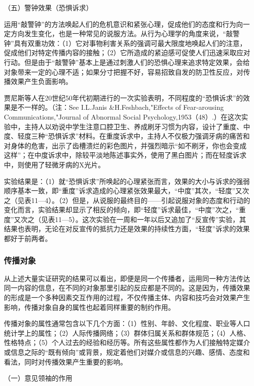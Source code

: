 \documentclass[UTF8,12pt]{ctexart}
\numberwithin{equation}{section} %
\numberwithin{figure}{section}
\numberwithin{table}{section}
\begin{document}
	（五）警钟效果（恐惧诉求）
	
	运用“敲警钟”的方法唤起人们的危机意识和紧张心理，促成他们的态度和行为向一定方向发生变化，也是一种常见的说服方法。从行为心理学的角度来说，“敲警钟”具有双重功效：（1）它对事物利害关系的强调可最大限度地唤起人们的注意，促成他们对特定传播内容的接触；（2）它所造成的紧迫感可促使人们迅速采取应对行动。但是由于“敲警钟”基本上是通过刺激人们的恐惧心理来追求特定效果，会给对象带来一定的心理不适；如果分寸把握不好，容易招致自发的防卫性反应，对传播效果产生负面影响。
	
	贾尼斯等人在20世纪50年代初期进行的一次实验表明，不同程度的“恐惧诉求”的效果是不一样的。（注：See I.L.Janis \&H.Feshbach,"Effects of Fear-arousing Communications,"Journal of Abnormal Social Psychology,1953（48）.）在这次实验中，主持人以劝说中学生注意口腔卫生、养成刷牙习惯为内容，设计了重度、中度、轻度三种“恐惧诉求”材料。在重度诉求中，主持人不仅极力强调牙病的痛苦和对身体的危害，出示了齿槽溃烂的彩色图片，并强烈暗示“如不刷牙，你也会变成这样”；在中度诉求中，除较平淡地陈述事实外，使用了黑白图片；而在轻度诉求中，则使用了轻微牙病的X光片。
	
	实验结果是：（1）就“恐惧诉求”所唤起的心理紧张而言，效果的大小与诉求的强弱顺序基本一致，即“重度”诉求造成的心理紧张效果最大，“中度”其次，“轻度”又次之（见表11—4）。（2）但是，从说服的最终目的——引起说服对象的态度和行动的变化而言，实验结果却显示了相反的倾向，即“轻度”诉求最佳，“中度”次之，“重度”又次之（见表11—5）。这次实验在一周和一年以后又追加了“反宣传”实验，其结果也表明，无论在对反宣传的抵抗力还是效果的持续性方面，“轻度”诉求的效果都好于前两者。
	
	
	\subsubsection{传播对象}
	
	从上述大量实证研究的结果可以看出，即便是同一个传播者，运用同一种方法传达同一内容的信息，在不同的对象那里引起的反应都是不同的。这是因为，传播效果的形成是一个多种因素交互作用的过程，不仅传播主体、内容和技巧会对效果产生影响，传播对象自身的属性也起着同样重要的制约作用。
	
	传播对象的属性通常包含以下几个方面：（1）性别、年龄、文化程度、职业等人口统计学上的属性；（2）人际传播网络；（3）群体归属关系和群体规范；（4）人格、性格特点；（5）个人过去的经验和经历等。所有这些属性都作为人们接触特定媒介或信息之际的“既有倾向”或背景，规定着他们对媒介或信息的兴趣、感情、态度和看法，同时对传播效果产生重要的影响。
	
	（一）意见领袖的作用
	
\end{document}

